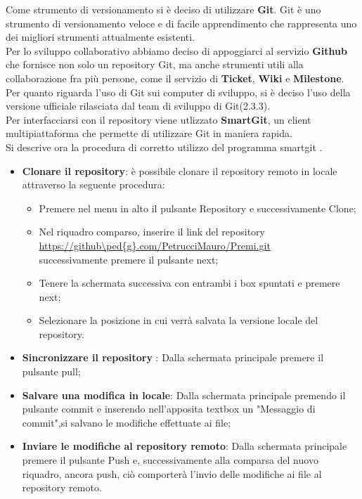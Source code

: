 Come strumento di versionamento si \`{e} deciso di utilizzare \textbf{Git}.
Git \`{e} uno strumento di versionamento veloce e di facile apprendimento che
rappresenta uno dei migliori strumenti attualmente esistenti.\\ Per lo sviluppo collaborativo abbiamo deciso di appoggiarci al servizio \textbf{Github} che fornisce non solo un repository Git, ma anche strumenti utili alla collaborazione fra pi\`{u} persone, come il servizio di \textbf{Ticket}, \textbf{Wiki} e \textbf{Milestone}.\\
Per quanto riguarda l’uso di Git sui computer di sviluppo, si \`{e} deciso l’uso
della versione ufficiale rilasciata dal team di sviluppo di Git(2.3.3).\\
Per interfacciarsi con il repository viene utlizzato \textbf{SmartGit}, un client multipiattaforma che permette di utilizzare Git in maniera rapida.\\
Si descrive ora la procedura di corretto utilizzo del programma smartgit .
\begin{itemize}

\item 	\textbf{Clonare il repository}: \`{e} possibile clonare il repository remoto in locale attraverso la seguente procedura:

\begin{itemize}
\item Premere nel menu in alto il pulsante Repository e successivamente Clone;
\item Nel riquadro comparso, inserire il link del repository\\ \url{https://github\ped{g}.com/PetrucciMauro/Premi.git}\\successivamente premere il pulsante  next;
\item Tenere la schermata successiva con entrambi i box spuntati e premere next;
\item Selezionare la posizione in cui verrà salvata la versione locale del repository.
\end{itemize}
\item \textbf{Sincronizzare il repository} : Dalla schermata principale premere il pulsante pull; 
\item \textbf{Salvare una modifica in locale}: Dalla schermata principale premendo il pulsante commit e inserendo nell'apposita textbox un "Messaggio di commit",si salvano le modifiche effettuate ai file;
\item \textbf{Inviare le modifiche al repository remoto}: Dalla schermata principale premere il pulsante Push e, successivamente alla comparsa del nuovo riquadro, ancora push, ci\`{o} comporter\`{a} l'invio delle modifiche ai file al repository remoto.

\end{itemize}

